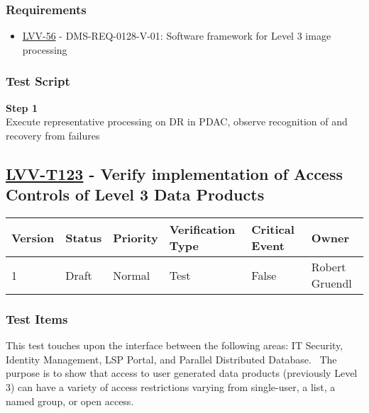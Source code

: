 \subsubsection{Requirements}\label{requirements-1}

\begin{itemize}
\tightlist
\item
  \href{https://jira.lsstcorp.org/browse/LVV-56}{LVV-56} -
  DMS-REQ-0128-V-01: Software framework for Level 3 image processing
\end{itemize}

\subsubsection{Test Script}\label{test-script-1}

\textbf{Step 1}\\
Execute representative processing on DR in PDAC, observe recognition of
and recovery from failures\\[2\baselineskip]

\hypertarget{lvv-t123---verify-implementation-of-access-controls-of-level-3-data-products}{\subsection{\texorpdfstring{\href{https://jira.lsstcorp.org/secure/Tests.jspa\#/testCase/LVV-T123}{LVV-T123}
- Verify implementation of Access Controls of Level 3 Data
Products}{LVV-T123 - Verify implementation of Access Controls of Level 3 Data Products}}\label{lvv-t123---verify-implementation-of-access-controls-of-level-3-data-products}}

\begin{longtable}[]{@{}llllll@{}}
\toprule
Version & Status & Priority & Verification Type & Critical Event &
Owner\tabularnewline
\midrule
\endhead
1 & Draft & Normal & Test & False & Robert Gruendl\tabularnewline
\bottomrule
\end{longtable}

\subsubsection{Test Items}\label{test-items-2}

This test touches upon the interface between the following areas: IT
Security, Identity Management, LSP Portal, and Parallel Distributed
Database. ~The purpose is to show that access to user generated data
products (previously Level 3) can have a variety of access restrictions
varying from single-user, a list, a named group, or open access.

